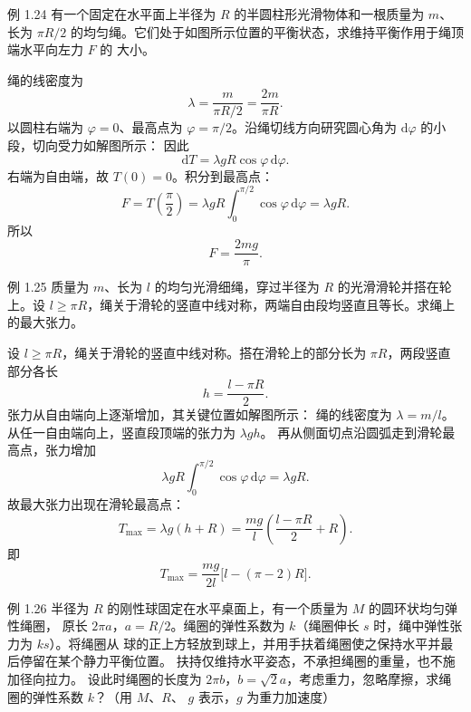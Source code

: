 \begin{origexamplebox}{例 1.24}
有一个固定在水平面上半径为 $R$ 的半圆柱形光滑物体和一根质量为 $m$、长为 $\pi R/2$
的均匀绳。它们处于如图所示位置的平衡状态，求维持平衡作用于绳顶端水平向左力 $F$ 的
大小。
\end{origexamplebox}

\begin{xesolution}
绳的线密度为
\[
  \lambda=\frac{m}{\pi R/2}=\frac{2m}{\pi R}.
\]
以圆柱右端为 $\varphi=0$、最高点为 $\varphi=\pi/2$。沿绳切线方向研究圆心角为
$\mathrm d\varphi$ 的小段，切向受力如解图所示：
\soldiagOneTwentyFour
因此
\[
  \mathrm dT=\lambda gR\cos\varphi\,\mathrm d\varphi.
\]
右端为自由端，故 $T(0)=0$。积分到最高点：
\[
  F=T\!\left(\frac\pi2\right)
  =\lambda gR\int_0^{\pi/2}\cos\varphi\,\mathrm d\varphi
  =\lambda gR.
\]
所以
\[
  \boxed{F=\frac{2mg}{\pi}}.
\]
\end{xesolution}

\begin{origexamplebox}{例 1.25}
质量为 $m$、长为 $l$ 的均匀光滑细绳，穿过半径为 $R$ 的光滑滑轮并搭在轮上。设
$l\ge\pi R$，绳关于滑轮的竖直中线对称，两端自由段均竖直且等长。求绳上的最大张力。
\end{origexamplebox}

\begin{xesolution}
设 $l\ge\pi R$，绳关于滑轮的竖直中线对称。搭在滑轮上的部分长为 $\pi R$，两段竖直
部分各长
\[
  h=\frac{l-\pi R}{2}.
\]
张力从自由端向上逐渐增加，其关键位置如解图所示：
\soldiagOneTwentyFive
绳的线密度为 $\lambda=m/l$。从任一自由端向上，竖直段顶端的张力为 $\lambda gh$。
再从侧面切点沿圆弧走到滑轮最高点，张力增加
\[
  \lambda gR\int_0^{\pi/2}\cos\varphi\,\mathrm d\varphi=\lambda gR.
\]
故最大张力出现在滑轮最高点：
\[
  T_{\max}=\lambda g(h+R)
  =\frac{mg}{l}\left(\frac{l-\pi R}{2}+R\right).
\]
即
\[
  \boxed{T_{\max}=\frac{mg}{2l}\bigl[l-(\pi-2)R\bigr]}.
\]
\end{xesolution}

\begin{origexamplebox}{例 1.26}
半径为 $R$ 的刚性球固定在水平桌面上，有一个质量为 $M$ 的圆环状均匀弹性绳圈，
原长 $2\pi a$，$a=R/2$。绳圈的弹性系数为 $k$（绳圈伸长 $s$ 时，绳中弹性张力为 $ks$）。将绳圈从
球的正上方轻放到球上，并用手扶着绳圈使之保持水平并最后停留在某个静力平衡位置。
扶持仅维持水平姿态，不承担绳圈的重量，也不施加径向拉力。
设此时绳圈的长度为 $2\pi b$，$b=\sqrt{2}a$，考虑重力，忽略摩擦，求绳圈的弹性系数 $k$？（用 $M$、$R$、
$g$ 表示，$g$ 为重力加速度）
\end{origexamplebox}

